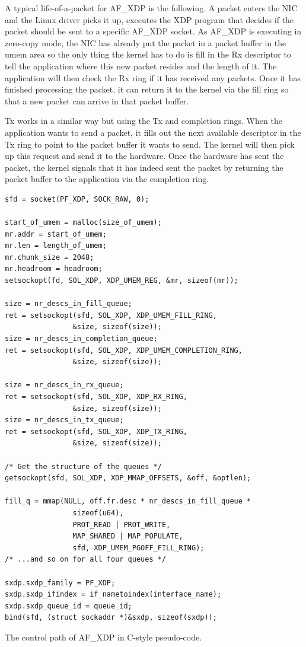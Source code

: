 \documentclass[9pt,numbers,reprint]{sigplanconf}
\begin{document}
A typical life-of-a-packet for AF\_XDP is the following. A packet
enters the NIC and the Linux driver picks it up, executes the XDP
program that decides if the packet should be sent to a specific AF\_XDP
socket. As AF\_XDP is executing in zero-copy mode, the NIC has already put
the packet in a packet buffer in the umem area so the only thing the
kernel has to do is fill in the Rx descriptor to tell the application
where this new packet resides and the length of it. The application
will then check the Rx ring if it has received any packets. Once it
has finished processing the packet, it can return it to the kernel via
the fill ring so that a new packet can arrive in that packet buffer.

Tx works in a similar way but using the Tx and completion rings. When
the application wants to send a packet, it fills out the next available
descriptor in the Tx ring to point to the packet buffer it wants to
send. The kernel will then pick up this request and send it to the
hardware. Once the hardware has sent the packet, the kernel signals
that it has indeed sent the packet by returning the packet buffer to
the application via the completion ring.

\begin{listing}[p]
\centering
\begin{verbatim}
sfd = socket(PF_XDP, SOCK_RAW, 0);

start_of_umem = malloc(size_of_umem);
mr.addr = start_of_umem;
mr.len = length_of_umem;
mr.chunk_size = 2048;
mr.headroom = headroom;
setsockopt(fd, SOL_XDP, XDP_UMEM_REG, &mr, sizeof(mr));

size = nr_descs_in_fill_queue;
ret = setsockopt(sfd, SOL_XDP, XDP_UMEM_FILL_RING,
                &size, sizeof(size));
size = nr_descs_in_completion_queue;
ret = setsockopt(sfd, SOL_XDP, XDP_UMEM_COMPLETION_RING,
                &size, sizeof(size));

size = nr_descs_in_rx_queue;
ret = setsockopt(sfd, SOL_XDP, XDP_RX_RING,
                &size, sizeof(size));
size = nr_descs_in_tx_queue;
ret = setsockopt(sfd, SOL_XDP, XDP_TX_RING,
                &size, sizeof(size));

/* Get the structure of the queues */
getsockopt(sfd, SOL_XDP, XDP_MMAP_OFFSETS, &off, &optlen);

fill_q = mmap(NULL, off.fr.desc * nr_descs_in_fill_queue *
                sizeof(u64),
                PROT_READ | PROT_WRITE,
                MAP_SHARED | MAP_POPULATE,
                sfd, XDP_UMEM_PGOFF_FILL_RING);
/* ...and so on for all four queues */

sxdp.sxdp_family = PF_XDP;
sxdp.sxdp_ifindex = if_nametoindex(interface_name);
sxdp.sxdp_queue_id = queue_id;
bind(sfd, (struct sockaddr *)&sxdp, sizeof(sxdp));
\end{verbatim}
\caption{The control path of AF\_XDP in C-style pseudo-code.}
\label{lst:ctrl_path}
\end{listing}
\end{document}
